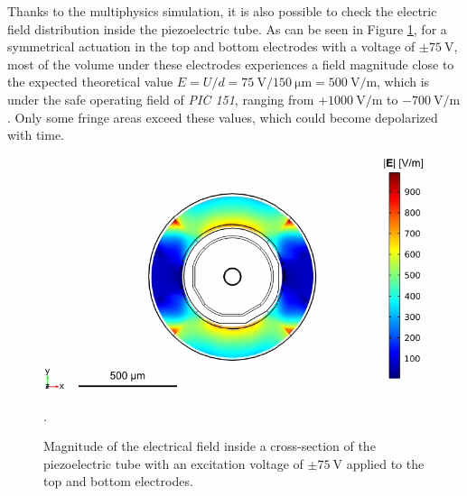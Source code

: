 Thanks to the multiphysics simulation, it is also possible to check the electric field distribution inside the piezoelectric tube. As can be seen in Figure \ref{fig:field}, for a symmetrical actuation in the top and bottom electrodes with a voltage of $\pm \SI{75}{\volt}$, most of the volume under these electrodes experiences a field magnitude close to the expected theoretical value $E=U/d = \SI{75}{\volt}/\SI{150}{\micro\meter} = \SI{500}{\volt/\meter}$, which is under the safe operating field of \textit{PIC 151}, ranging from $ +\SI{1000}{\volt/\meter}$ to $ -\SI{700}{\volt/\meter}$. Only some fringe areas exceed these values, which could become depolarized with time.
\begin{figure}[h!]\centering
      \includegraphics{figures/30_DesignSimulation/Mechanical/field.pdf}
      \caption{Magnitude of the electrical field inside a cross-section of the piezoelectric tube with an excitation voltage of $\pm \SI{75}{\volt}$ applied to the top and bottom electrodes.}.
      \label{fig:field}
\end{figure}
      
      
